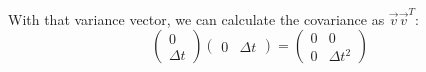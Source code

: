 \documentclass[10pt]{article}
\begin{document}
\begin{enumerate}
\begin{enumerate}
  With that variance vector, we can calculate the covariance as
  $\vec{v}\vec{v}^T$:
  $$
\begin{pmatrix}0 \\ \Delta t\end{pmatrix}\begin{pmatrix}0 & \Delta
t\end{pmatrix} = 
\begin{pmatrix}0 & 0 \\ 0 & \Delta t^2\end{pmatrix}
$$

  \end{enumerate}

\end{enumerate}
\end{document}
